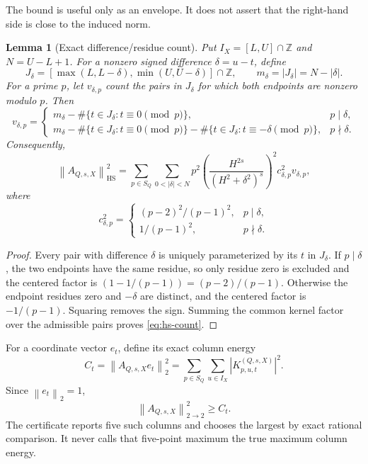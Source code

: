 \documentclass[10pt,a4paper]{article}
\newtheorem{lemma}{Lemma}
\newcommand{\HS}{\operatorname{HS}}
\newcommand{\norm}[1]{\left\lVert #1\right\rVert}
\begin{document}
The bound is useful only as an envelope.  It does not assert that the
right-hand side is close to the induced norm.

\begin{lemma}[Exact difference/residue count]
Put $I_X=[L,U]\cap\mathbb Z$ and $N=U-L+1$.  For a nonzero signed difference
$\delta=u-t$, define
\[
 J_\delta=[\max(L,L-\delta),\min(U,U-\delta)]\cap\mathbb Z,
 \qquad m_\delta=|J_\delta|=N-|\delta|.
\]
For a prime $p$, let $v_{\delta,p}$ count the pairs in $J_\delta$ for which
both endpoints are nonzero modulo $p$.  Then
\[
 v_{\delta,p}=\begin{cases}
 m_\delta-\#\{t\in J_\delta:t\equiv0\pmod p\},&p\mid\delta,\\[2mm]
 m_\delta-\#\{t\in J_\delta:t\equiv0\pmod p\}
 -\#\{t\in J_\delta:t\equiv-\delta\pmod p\},&p\nmid\delta.
 \end{cases}
 \label{eq:valid-count}
\]
Consequently,
\begin{equation}
 \norm{A_{Q,s,X}}_{\HS}^2
 =\sum_{p\in S_Q}\sum_{0<|\delta|<N}
 p^2\left(\frac{H^{2s}}{(H^2+\delta^2)^s}\right)^2
 c_{\delta,p}^2v_{\delta,p},
 \label{eq:hs-count}
\end{equation}
where
\[
 c_{\delta,p}^2=\begin{cases}(p-2)^2/(p-1)^2,&p\mid\delta,\\
 1/(p-1)^2,&p\nmid\delta.
 \end{cases}
\]
\end{lemma}

\begin{proof}
Every pair with difference $\delta$ is uniquely parameterized by its $t$ in
$J_\delta$.  If $p\mid\delta$, the two endpoints have the same residue, so
only residue zero is excluded and the centered factor is
$(1-1/(p-1))=(p-2)/(p-1)$.  Otherwise the endpoint residues zero and
$-\delta$ are distinct, and the centered factor is $-1/(p-1)$.  Squaring
removes the sign.  Summing the common kernel factor over the admissible pairs
proves \eqref{eq:hs-count}.
\end{proof}

For a coordinate vector $e_t$, define its exact column energy
\begin{equation}
 C_t=\norm{A_{Q,s,X}e_t}_2^2
 =\sum_{p\in S_Q}\sum_{u\in I_X}|K_{p,u,t}^{(Q,s,X)}|^2.
 \label{eq:column}
\end{equation}
Since $\norm{e_t}_2=1$,
\begin{equation}
 \norm{A_{Q,s,X}}_{2\to2}^2\geq C_t.
 \label{eq:column-lower}
\end{equation}
The certificate reports five such columns and chooses the largest by exact
rational comparison.  It never calls that five-point maximum the true
maximum column energy.
\end{document}
